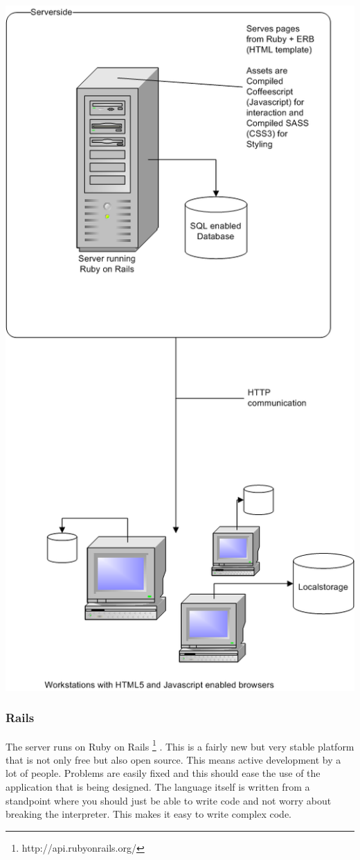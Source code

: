 \documentclass{report}
\begin{document}
				\includegraphics[scale=0.7]{EAD.png} \\				
				\subsubsection{Rails}
					The server runs on Ruby on Rails \footnote{http://api.rubyonrails.org/} . This is a fairly new but very stable platform that is not only free but also open source. This means active development by a lot of people. Problems are easily fixed and this should ease the use of the application that is being designed. The language itself is written from a standpoint where you should just be able to write code and not worry about breaking the interpreter. This makes it easy to write complex code.				
\end{document}
